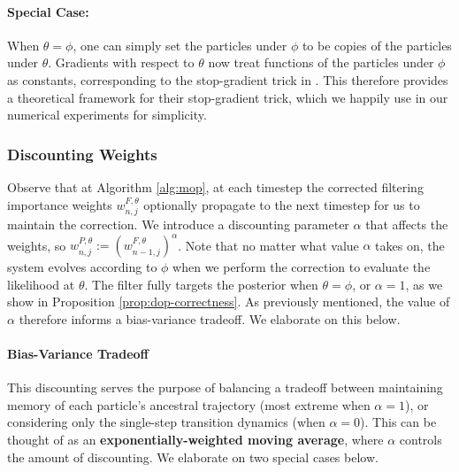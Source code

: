 \documentclass{article}
\begin{document}
\paragraph{Special Case:} When $\theta = \phi$, one can simply set the particles under $\phi$ to be copies of the particles under $\theta$. Gradients with respect to $\theta$ now treat functions of the particles under $\phi$ as constants, corresponding to the stop-gradient trick in \cite{scibior2021dpf}. This therefore provides a theoretical framework for their stop-gradient trick, which we happily use in our numerical experiments for simplicity. 



\subsubsection{Discounting Weights}


Observe that at Algorithm \ref{alg:mop}, at each timestep the corrected filtering importance weights $w_{n,j}^{F,\theta}$ optionally propagate to the next timestep for us to maintain the correction. We introduce a discounting parameter $\alpha$ that affects the weights, so $w_{n,j}^{P,\theta} := (w_{n-1,j}^{F,\theta})^{\alpha}$. Note that no matter what value $\alpha$ takes on, the system evolves according to $\phi$ when we perform the correction to evaluate the likelihood at $\theta$. The filter fully targets the posterior when $\theta=\phi$, or $\alpha=1$, as we show in Proposition \ref{prop:dop-correctness}. As previously mentioned, the value of $\alpha$ therefore informs a bias-variance tradeoff. We elaborate on this below. 


\paragraph{Bias-Variance Tradeoff} This discounting serves the purpose of balancing a tradeoff between maintaining memory of each particle's ancestral trajectory (most extreme when $\alpha=1$), or considering only the single-step transition dynamics (when $\alpha=0$). This can be thought of as an \textbf{exponentially-weighted moving average}, where $\alpha$ controls the amount of discounting. We elaborate on two special cases below.
\end{document}
